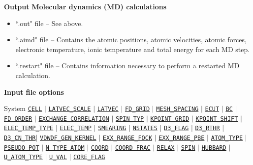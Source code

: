 \documentclass[xcolor=dvipsnames,t]{beamer}
\begin{document}
\begin{frame}{\textbf{Output}}
\textbf{Molecular dynamics (MD) calculations}  \\
\begin{itemize}
  \item ``.out" file -- See above.
  \item ``.aimd" file -- Contains the atomic positions, atomic velocities, atomic forces, electronic temperature, ionic temperature and total energy for each MD step.
  \item ``.restart" file -- Contains information necessary to perform a restarted MD calculation. 
\end{itemize}

\end{frame}



\begin{frame}[allowframebreaks]{\textbf{Input file options}} \label{Index}
\vspace{-2mm}
\begin{block}{System}
\hyperlink{CELL}{\texttt{CELL}} $\vert$ 
\hyperlink{LATVEC_SCALE}{\texttt{LATVEC\_SCALE}} $\vert$ 
\hyperlink{LATVEC}{\texttt{LATVEC}}  $\vert$ 
\hyperlink{FD_GRID}{\texttt{FD\_GRID}} $\vert$ 
\hyperlink{MESH_SPACING}{\texttt{MESH\_SPACING}} $\vert$ 
\hyperlink{ECUT}{\texttt{ECUT}} $\vert$ 
\hyperlink{BC}{\texttt{BC}} $\vert$ 
\hyperlink{FD_ORDER}{\texttt{FD\_ORDER}} $\vert$ 
\hyperlink{EXCHANGE_CORRELATION}{\texttt{EXCHANGE\_CORRELATION}} $\vert$ 
\hyperlink{SPIN_TYP}{\texttt{SPIN\_TYP}} $\vert$ 
\hyperlink{KPOINT_GRID}{\texttt{KPOINT\_GRID}} $\vert$ 
\hyperlink{KPOINT_SHIFT}{\texttt{KPOINT\_SHIFT}} $\vert$ 
\hyperlink{ELEC_TEMP_TYPE}{\texttt{ELEC\_TEMP\_TYPE}} $\vert$ 
\hyperlink{ELEC_TEMP}{\texttt{ELEC\_TEMP}} $\vert$ 
\hyperlink{SMEARING}{\texttt{SMEARING}} $\vert$ 
\hyperlink{NSTATES}{\texttt{NSTATES}}    $\vert$ 
\hyperlink{D3_FLAG}{\texttt{D3\_FLAG}} $\vert$ 
\hyperlink{D3_RTHR}{\texttt{D3\_RTHR}} $\vert$ 
\hyperlink{D3_CN_THR}{\texttt{D3\_CN\_THR}}$\vert$ 
\hyperlink{VDWDF_GEN_KERNEL}{\texttt{VDWDF\_GEN\_KERNEL}} $\vert$ 
\hyperlink{EXX_RANGE_FOCK}{\texttt{EXX\_RANGE\_FOCK}} $\vert$  
\hyperlink{EXX_RANGE_PBE}{\texttt{EXX\_RANGE\_PBE}} $\vert$ 
\hyperlink{ATOM_TYPE}{\texttt{ATOM\_TYPE}} $\vert$ 
\hyperlink{PSEUDO_POT}{\texttt{PSEUDO\_POT}}  $\vert$ 
\hyperlink{N_TYPE_ATOM}{\texttt{N\_TYPE\_ATOM}} $\vert$ 
\hyperlink{COORD}{\texttt{COORD}} $\vert$ 
\hyperlink{COORD_FRAC}{\texttt{COORD\_FRAC}} $\vert$ 
\hyperlink{RELAX}{\texttt{RELAX}} $\vert$ 
\hyperlink{SPIN}{\texttt{SPIN}} $\vert$ 
\hyperlink{HUBBARD}{\texttt{HUBBARD}} $\vert$ 
\hyperlink{U_ATOM_TYPE}{\texttt{U\_ATOM\_TYPE}} $\vert$ 
\hyperlink{U_VAL}{\texttt{U\_VAL}} $\vert$ 
\hyperlink{CORE_FLAG}{\texttt{CORE\_FLAG}} 
\end{block}


\end{frame}
\end{document}
